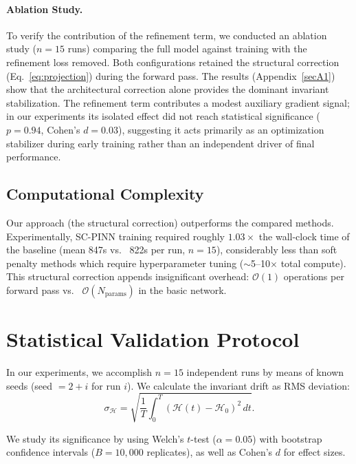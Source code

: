 \documentclass[pdflatex,sn-mathphys-num]{sn-jnl}
\theoremstyle{thmstyleone}%
\theoremstyle{thmstyletwo}%
\theoremstyle{thmstylethree}%
\newcommand{\methodname}{SC-PINN}
\providecommand{\vs}{vs.\ }
\begin{document}
	\paragraph{Ablation Study.} To verify the contribution of the refinement term, we conducted an ablation study ($n=15$ runs) comparing the full model against training with the refinement loss removed. Both configurations retained the structural correction (Eq.~\ref{eq:projection}) during the forward pass. The results (Appendix~\ref{secA1}) show that the architectural correction alone provides the dominant invariant stabilization. The refinement term contributes a modest auxiliary gradient signal; in our experiments its isolated effect did not reach statistical significance ($p = 0.94$, Cohen's $d = 0.03$), suggesting it acts primarily as an optimization stabilizer during early training rather than an independent driver of final performance.
	
	\subsection{Computational Complexity}\label{subsec4.3}
	
	Our approach (the structural correction) outperforms the compared methods. Experimentally, \methodname{} training required roughly $1.03\times$ the wall-clock time of the baseline (mean 847s \vs{} 822s per run, $n=15$), considerably less than soft penalty methods which require hyperparameter tuning ($\sim$5--10$\times$ total compute). This structural correction appends insignificant overhead: $\mathcal{O}(1)$ operations per forward pass \vs{} $\mathcal{O}(N_{\text{params}})$ in the basic network.
	
	\section{Statistical Validation Protocol}\label{sec5}
	
	In our experiments, we accomplish $n=15$ independent runs by means of known seeds (seed $= 2 + i$ for run $i$). We calculate the invariant drift as RMS deviation:
	\begin{equation}
	\sigma_{\mathcal{H}} = \sqrt{\frac{1}{T}\int_0^T (\mathcal{H}(t)-\mathcal{H}_0)^2\,dt}.
	\end{equation}
	
	We study its significance by using Welch's $t$-test ($\alpha=0.05$) with bootstrap confidence intervals ($B=10{,}000$ replicates), as well as Cohen's $d$ \cite{cohen2013statistical} for effect sizes. 
	
\end{document}
